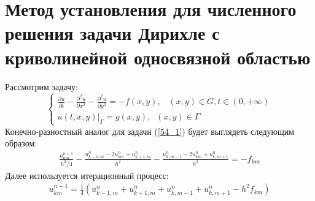 \documentclass[__main__.tex]{subfiles}
\begin{document}
\section{Метод установления для численного решения задачи Дирихле с криволинейной односвязной областью}

Рассмотрим задачу:
\begin{equation}
\label{54_1}
\begin{cases}
\frac{\partial u}{\partial t}-\frac{\partial^2 u}{\partial x^2}-\frac{\partial^2 u}{\partial y^2} = -f(x,y),\;\;\;(x,y)\in G, t\in (0,+\infty)\\
u(t,x,y)|_\Gamma = g(x,y), \;\;(x,y)\in \Gamma
\end{cases}
\end{equation}
Конечно-разностный аналог для задачи (\ref{54_1}) будет выглядеть следующим образом:
\begin{gather*}
	\frac{u^{n+1}_{nm}}{h^2/4}-\frac{u^n_{k-1,m}-2u^n_{km}+u^n_{k+1,m}}{h^2}-\frac{u^n_{k,m-1}-2u^n_{km}+u^n_{k,m+1}}{h^2} = -f_{km}
\end{gather*}
Далее используется итерационный процесс:
\begin{gather*}
	u^{n+1}_{km}=\frac{1}{4}\left(u^n_{k-1,m}+u^n_{k+1,m}+u^n_{k,m-1}+u^n_{k,m+1}-h^2f_{km}\right)
\end{gather*}
\end{document}
